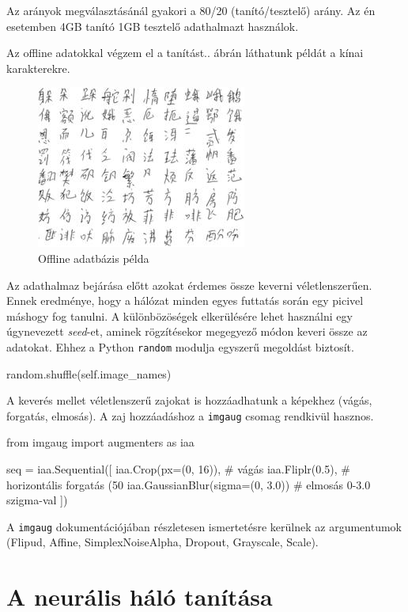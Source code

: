 Az arányok megválasztásánál gyakori a 80/20 (tanító/tesztelő) arány. Az én esetemben 4GB tanító 1GB tesztelő adathalmazt használok.

Az offline adatokkal végzem el a tanítást.. ábrán láthatunk példát a kínai karakterekre.

\begin{figure}[h]
	\centering
	\includegraphics[scale=2.0]{images/offline_dataset}
	\caption{Offline adatbázis példa}
	\label{fig:offline_dataset}
\end{figure} 

Az adathalmaz bejárása előtt azokat érdemes össze keverni véletlenszerűen. Ennek eredménye, hogy a hálózat minden egyes futtatás során egy picivel máshogy fog tanulni. A különbözöségek elkerülésére lehet használni egy úgynevezett \textit{seed}-et, aminek rögzítésekor megegyező módon keveri össze az adatokat. Ehhez a Python \texttt{random} modulja egyszerű megoldást biztosít.
\begin{python}
random.shuffle(self.image_names)
\end{python}

A keverés mellet véletlenszerű zajokat is hozzáadhatunk a képekhez (vágás, forgatás, elmosás). A zaj hozzáadáshoz a \texttt{imgaug} csomag rendkivül hasznos.

\begin{python}
from imgaug import augmenters as iaa

seq = iaa.Sequential([
    iaa.Crop(px=(0, 16)), # vágás 
    iaa.Fliplr(0.5), # horizontális forgatás (50%
    iaa.GaussianBlur(sigma=(0, 3.0)) # elmosás 0-3.0 szigma-val
])
\end{python}

A \texttt{imgaug} dokumentációjában részletesen ismertetésre kerülnek az argumentumok (Flipud, Affine, SimplexNoiseAlpha, Dropout, Grayscale, Scale).

\section{A neurális háló tanítása}

